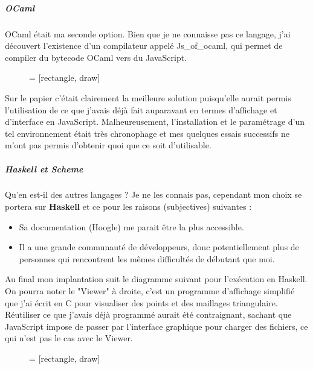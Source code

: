 \documentclass[]{article}
\begin{document}
\subparagraph*{OCaml}
OCaml était ma seconde option. Bien que je ne connaisse pas ce langage, j'ai découvert l'existence d'un compilateur appelé Js\_of\_ocaml, qui permet de compiler du bytecode OCaml vers du JavaScript.
\begin{figure}[H]
	\begin{center}
		 = [rectangle, draw]
	\end{center}
\end{figure}
Sur le papier c'était clairement la meilleure solution puisqu'elle aurait permis l'utilisation de ce que j'avais déjà fait auparavant en termes d'affichage et d'interface en JavaScript. Malheureusement, l'installation et le paramétrage d'un tel environnement était très chronophage et mes quelques essais successifs ne m'ont pas permis d'obtenir quoi que ce soit d'utilisable.

\subparagraph*{Haskell et Scheme}
Qu'en est-il des autres langages ? Je ne les connais pas, cependant mon choix se portera sur \textbf{Haskell} et ce pour les raisons (subjectives) suivantes :
\begin{itemize}
	\item Sa documentation (Hoogle) me parait être la plus accessible.
	\item Il a une grande communauté de développeurs, donc potentiellement plus de personnes qui rencontrent les mêmes difficultés de débutant que moi.
\end{itemize}
Au final mon implantation suit le diagramme suivant pour l'exécution en Haskell. On pourra noter le "Viewer" à droite, c'est un programme d'affichage simplifié que j'ai écrit en C pour visualiser des points et des maillages triangulaire. Réutiliser ce que j'avais déjà programmé aurait été contraignant, sachant que JavaScript impose de passer par l'interface graphique pour charger des fichiers, ce qui n'est pas le cas avec le Viewer.
\begin{figure}[H]
	\begin{center}
		 = [rectangle, draw]
	\end{center}
\end{figure}
\end{document}
